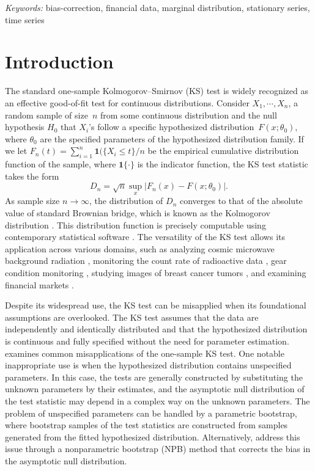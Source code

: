 \documentclass[12pt]{article}
\begin{document}
\noindent%
{\it Keywords:}  bias-correction, financial data, marginal distribution,
  stationary series, time series
\vfill

\newpage

\doublespacing

\section{Introduction}\label{sec:intro}

The standard one-sample Kolmogorov--Smirnov (KS) test is widely
recognized as an effective good-of-fit test for continuous distributions.
Consider $X_1,  \cdots , X_n$, a random sample of size~$n$ from some continuous
distribution and the null hypothesis $H_0$ that $X_i$'s follow a specific
hypothesized distribution~$F(x; \theta_0)$, where $\theta_0$ are the
specified parameters
of the hypothesized distribution family.
If we let $F_n(t) = \sum_{i=1}^n \mathbf{1}(\{X_i \le t\} / n$ be the empirical cumulative
distribution function of the sample, where $\mathbf{1}\{\cdot\}$ is the indicator
function, the KS test statistic takes the form
\[
  D_n = \sqrt{n} \sup_x | F_{n}(x) - F(x; \theta_0)|.
\]
As sample size $n\to \infty$, the distribution of $D_n$ converges to that of the
absolute value of standard Brownian bridge, which is known as the Kolmogorov
distribution \citep{stephens1974edf}. This distribution function is
precisely computable using contemporary statistical software
\citep{marsaglia2003evaluating}. The versatility of the KS test allows its
application across various domains, such as analyzing cosmic microwave
background radiation \citep{naess2012application}, monitoring the count rate of
radioactive data \citep{aslam2020introducing}, gear condition monitoring
\citep{andrade2001gear}, studying images of breast cancer tumors
\citep{demidenko2004kolmogorov}, and examining financial markets
\citep{lux2001turbulence}.


Despite its widespread use, the KS test can be
misapplied when its foundational assumptions are overlooked. The KS test
assumes that the data are independently and identically distributed and
that the hypothesized distribution is continuous and fully specified without
the need for parameter estimation. \citet{zeimbekakis2022misuses} examines
common misapplications of the one-sample KS test. One notable inappropriate
use is when the hypothesized distribution contains unspecified parameters.
In this case, the tests are generally constructed by substituting the unknown
parameters by their estimates, and the asymptotic null distribution of
the test statistic may depend in a complex way on the unknown parameters.
The problem of unspecified parameters can be handled by a parametric
bootstrap, where bootstrap samples of the test statistics are constructed from
samples generated from the fitted hypothesized distribution.
Alternatively, \citet{babu2004goodness} address this issue through a
nonparametric bootstrap (NPB) method that corrects the bias in the asymptotic null
distribution.
\end{document}
